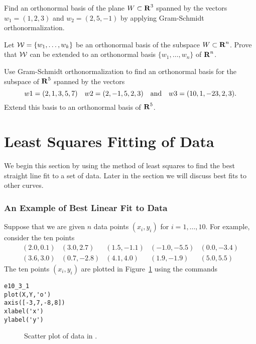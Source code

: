 \begin{exercise} \label{c7.5.2}
Find an orthonormal basis of the plane $W\subset\mbox{$\bf{R}$}^3$ spanned by the
vectors $w_1=(1,2,3)$ and $w_2=(2,5,-1)$ by applying Gram-Schmidt
orthonormalization.
\end{exercise}

\begin{exercise} \label{c7.5.3}
Let ${\cal W}=\{w_1,\ldots,w_k\}$ be an orthonormal basis of the subspace
$W\subset\mbox{$\bf{R}$}^n$.  Prove that ${\cal W}$ can be extended to an orthonormal
basis $\{w_1,\ldots,w_n\}$ of $\mbox{$\bf{R}$}^n$.
\end{exercise}

\CEXER

\begin{exercise} \label{c7.5.4}
Use Gram-Schmidt orthonormalization to find an orthonormal basis for the
subspace of $\mbox{$\bf{R}$}^5$ spanned by the vectors
\begin{equation*}
w1 = (2,1,3,5,7) \quad w2 = (2,-1,5,2,3) \quad\mbox{and}\quad w3 = (10,1,-23,2,3).
\end{equation*}
Extend this basis to an orthonormal basis of $\mbox{$\bf{R}$}^5$.
\end{exercise}




\section{Least Squares Fitting of Data} \label{S:7.6}

We begin this section by using the method of least squares to find the
best straight line fit to a set of data.  Later in the section we will
discuss best fits to other curves.

\subsubsection*{An Example of Best Linear Fit to Data}

Suppose that we are given $n$ data points
$(x_i,y_i)$ for $i=1,\ldots,10$.
For example, consider the ten points
\begin{equation*}  \label{E:scatterdata}
\begin{array}{ccccc}
(2.0,0.1) & (3.0,2.7) & (1.5,-1.1) & (-1.0,-5.5) & (0.0,-3.4)\\
(3.6,3.0) & (0.7,-2.8) & (4.1,4.0) & (1.9,-1.9) & (5.0,5.5) \end{array}
\end{equation*}
The ten points $(x_i,y_i)$ are plotted in Figure~\ref{F:linreg} using the
commands
\begin{verbatim}
e10_3_1
plot(X,Y,'o')
axis([-3,7,-8,8])
xlabel('x')
ylabel('y')
\end{verbatim}
\begin{figure}[htb]
     \centerline{%
     }
     \caption{Scatter plot of data in \protect{}.}
     \label{F:linreg}
\end{figure}

